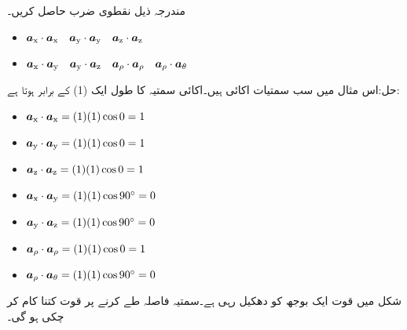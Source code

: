 مندرجہ ذیل نقطوی ضرب حاصل کریں۔
\begin{itemize}
\item
$\ax \cdot \ax \quad \ay \cdot \ay \quad \az \cdot \az$
\item
$\ax \cdot \ay \quad \ay \cdot \az \quad \arho \cdot \arho \quad \arho \cdot \atheta$
\end{itemize}

حل:اس مثال میں سب سمتیات اکائی  ہیں۔اکائی سمتیہ کا طول ایک (1) کے برابر ہوتا ہے:
\begin{itemize}
\item
$\ax \cdot \ax =(1) (1) \cos 0=1$
\item
$\ay \cdot \ay =(1) (1) \cos 0=1$
\item
$\az \cdot \az =(1) (1) \cos 0=1$
\item
$\ax \cdot \ay =(1) (1) \cos 90^{\circ}=0$
\item
$\ay \cdot \az =(1) (1) \cos 90^{\circ}=0$
\item
$\arho \cdot \arho =(1) (1) \cos 0=1$
\item
$\arho \cdot \atheta =(1) (1) \cos 90^{\circ}=0$
\end{itemize}
شکل   میں قوت  ایک بوجھ کو دھکیل رہی ہے۔سمتیہ فاصلہ   طے کرنے پر قوت کتنا کام کر چکی ہو گی۔

